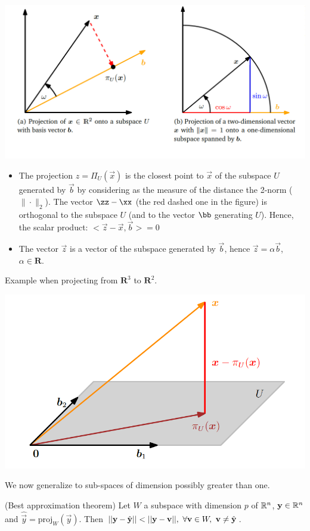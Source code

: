 \includegraphics[width=0.7 \textwidth]{sections/images/orth2.png}

\begin{itemize}
    \item The projection $z=\Pi_U(\vec{x})$ is the closest point to $\vec{x}$ of the subspace $U$ generated by $\vec{b}$  by considering as the measure of the distance the 2-norm ($\| \cdot \|_2$). The vector $\zz -\xx$ (the red dashed one in the figure) is orthogonal to the subspace $U$ (and to the vector $\bb$ generating $U$). Hence, the scalar product: $<\vec{z}-\vec{x},\vec{b}>=0$
    \item The vector $\vec{z}$ is a vector of the subspace generated by $\vec{b}$, hence $\vec{z}=\alpha \vec{b}$, $\alpha \in \mathbf{R}.$
  
\end{itemize}




Example when projecting from $\mathbf{R}^3$ to $\mathbf{R}^2$.

\includegraphics[width=0.7 \textwidth]{sections/images/orth3.png}

We now generalize to sub-spaces of dimension possibly greater than one.

\begin{theorem} (Best approximation theorem)
    Let $W$ a subspace with dimension $p$ of $\mathbb{R}^n$, $\mathbf{y} \in \mathbb{R}^n$ and $\hat{\vec{y}} = \mathrm{proj}_W(\vec{y})$. Then $||\mathbf{y} - \hat{\mathbf{y}}|| < ||\mathbf{y} - \mathbf{v}||,\ \forall \mathbf{v} \in W,\ \mathbf{v} \neq \hat{\mathbf{y}}$.
\end{theorem}

